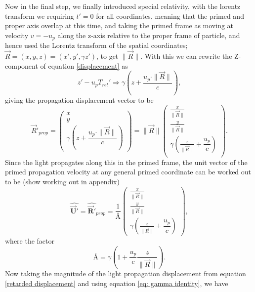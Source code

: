 Now in the final step, we finally introduced special relativity, with the lorentz transform we requiring $t'= 0$ for all coordinates, meaning that the primed and proper axis overlap at this time, and taking the primed frame as moving at velocity $v=-u_p$ along the z-axis relative to the proper frame of particle, and hence used the Lorentz transform of the spatial coordinates; $\vec{R}=(x,y,z)=(x',y',\gamma z')$, to get $\|\vec{R}\|$. With this we can rewrite the Z-component of equation \eqref{displacement} as
\begin{equation}%
    z' - u_p T_{ret}' \Rightarrow \gamma\left(z + \frac{u_p\cdot \|\vec{R}\|}{c}\right),
\end{equation}%
giving the propagation displacement vector to be
\begin{equation}%
\label{retarded displacement}
    \Vec{R}'_{prop}= \begin{pmatrix}
    x\\ y \\ \gamma \left(z + \dfrac{u_p \cdot \|\vec{R}\|}{c}\right)
    \end{pmatrix} = \|\vec{R}\|\begin{pmatrix}
    \frac{x}{\|\vec{R}\|}\\ \frac{y}{\|\vec{R}\|} \\ \gamma \left( \frac{z}{\|\vec{R}\|} + \dfrac{u_p}{c} \right)\\
    \end{pmatrix}.
\end{equation}%
Since the light propagates along this in the primed frame, the unit vector of the primed propagation velocity at any general primed coordinate can be worked out to be (show working out in appendix)
\begin{equation}%
\label{eq: unit retarded velocity}
    \hat{\mathbf{\vec{U}'}} = \hat{\mathbf{\vec{R}'}}_{prop} = \dfrac{1}{\text{\AA}} \begin{pmatrix}
    \frac{x}{\|\vec{R}\|}\\ \frac{y}{\|\vec{R}\|} \\ \gamma \left( \frac{z}{\|\vec{R}\|} + \dfrac{u_p}{c} \right)
    \end{pmatrix},
\end{equation}%
where the factor
\begin{equation}%
    \text{\AA} = \gamma\left( 1 + \frac{u_p}{c}\frac{z}{\|\vec{R}\|} \right).
\end{equation}%
Now taking the magnitude of the light propagation displacement from equation \eqref{retarded displacement} and using equation \eqref{eq: gamma identity}, we have
